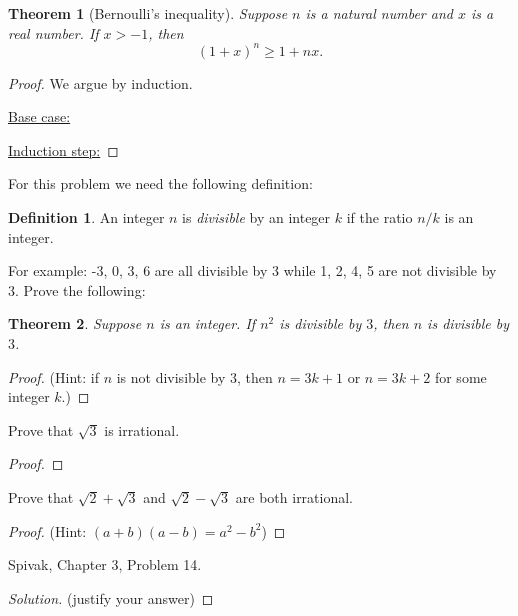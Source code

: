\documentclass{article} %
\theoremstyle{plain}
\newtheorem*{theorem*}{Theorem}
\theoremstyle{definition}
\newtheorem*{definition*}{Definition}
\begin{document}
\begin{theorem*}[Bernoulli's inequality] Suppose $n$ is a natural number and $x$ is a real number. If $x > -1$, then 
$$
(1+x)^n \geq 1 + nx.
$$
\end{theorem*} 

\begin{proof} We argue by induction. 

\underline{Base case:}

\underline{Induction step:} 

\end{proof} 
 



\noindent {} For this problem we need the following definition: 

\begin{definition*}
An integer $n$ is \emph{divisible} by an integer $k$ if the ratio $n/k$ is an integer. 
\end{definition*}

For example: -3, 0, 3, 6 are all divisible by 3 while 1, 2, 4, 5 are not divisible by 3.  Prove the following: 


\begin{theorem*} Suppose $n$ is an integer. If $n^2$ is divisible by $3$, then $n$ is divisible by $3$. 

\end{theorem*}

 \begin{proof} (Hint: if $n$ is not divisible by $3$, then $n=3k+1$ or $n=3k+2$ for some integer $k$.) \end{proof} 
 
 \noindent {} Prove that $\sqrt{3}$ is irrational.  

 \begin{proof} \end{proof} 

\noindent {} Prove that $\sqrt{2} + \sqrt{3}$ and $\sqrt{2}-\sqrt{3}$ are both irrational.  

 \begin{proof} (Hint: $(a+b)(a-b) = a^2-b^2$) \end{proof} 
 
  \noindent {} Spivak, Chapter 3, Problem 14. 
  
  \begin{proof}[Solution] (justify your answer)
  
  \end{proof} 
\end{document}
